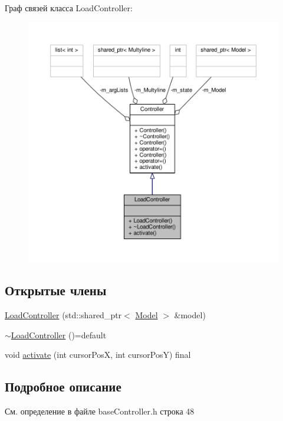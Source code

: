 Граф связей класса Load\-Controller\-:
\nopagebreak
\begin{figure}[H]
\begin{center}
\leavevmode
\includegraphics[width=350pt]{class_load_controller__coll__graph}
\end{center}
\end{figure}
\subsection*{Открытые члены}
\begin{DoxyCompactItemize}
\item 
\hyperlink{class_load_controller_acb89a633078f6fd64c60c98c9ead4c49}{Load\-Controller} (std\-::shared\-\_\-ptr$<$ \hyperlink{class_model}{Model} $>$ \&model)
\item 
\hyperlink{class_load_controller_ab4d73ee743830dd22bcc0857656f77f7}{$\sim$\-Load\-Controller} ()=default
\item 
void \hyperlink{class_load_controller_aa9fc9b866ea0abda7d8d766ffa9256f4}{activate} (int cursor\-Pos\-X, int cursor\-Pos\-Y) final
\end{DoxyCompactItemize}


\subsection{Подробное описание}


См. определение в файле base\-Controller.\-h строка 48



